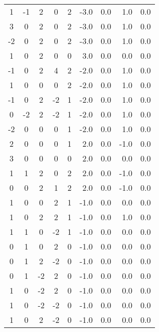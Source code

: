 \begin{center}
{\begin{xtabular}{|ccccc|rr|rr|}
  1 & -1 &  2 &  0 &  2 &      -3.0  &      0.0  &      1.0   &     0.0     \\
  3 &  0 &  2 &  0 &  2 &      -3.0  &      0.0  &      1.0   &     0.0     \\
 -2 &  0 &  2 &  0 &  2 &      -3.0  &      0.0  &      1.0   &     0.0     \\
  1 &  0 &  2 &  0 &  0 &       3.0  &      0.0  &      0.0   &     0.0     \\
 -1 &  0 &  2 &  4 &  2 &      -2.0  &      0.0  &      1.0   &     0.0     \\
  1 &  0 &  0 &  0 &  2 &      -2.0  &      0.0  &      1.0   &     0.0     \\
 -1 &  0 &  2 & -2 &  1 &      -2.0  &      0.0  &      1.0   &     0.0     \\
  0 & -2 &  2 & -2 &  1 &      -2.0  &      0.0  &      1.0   &     0.0     \\
 -2 &  0 &  0 &  0 &  1 &      -2.0  &      0.0  &      1.0   &     0.0     \\
  2 &  0 &  0 &  0 &  1 &       2.0  &      0.0  &     -1.0   &     0.0     \\
  3 &  0 &  0 &  0 &  0 &       2.0  &      0.0  &      0.0   &     0.0     \\
  1 &  1 &  2 &  0 &  2 &       2.0  &      0.0  &     -1.0   &     0.0     \\
  0 &  0 &  2 &  1 &  2 &       2.0  &      0.0  &     -1.0   &     0.0     \\
  1 &  0 &  0 &  2 &  1 &      -1.0  &      0.0  &      0.0   &     0.0     \\
  1 &  0 &  2 &  2 &  1 &      -1.0  &      0.0  &      1.0   &     0.0     \\
  1 &  1 &  0 & -2 &  1 &      -1.0  &      0.0  &      0.0   &     0.0     \\
  0 &  1 &  0 &  2 &  0 &      -1.0  &      0.0  &      0.0   &     0.0     \\
  0 &  1 &  2 & -2 &  0 &      -1.0  &      0.0  &      0.0   &     0.0     \\
  0 &  1 & -2 &  2 &  0 &      -1.0  &      0.0  &      0.0   &     0.0     \\
  1 &  0 & -2 &  2 &  0 &      -1.0  &      0.0  &      0.0   &     0.0     \\
  1 &  0 & -2 & -2 &  0 &      -1.0  &      0.0  &      0.0   &     0.0     \\
  1 &  0 &  2 & -2 &  0 &      -1.0  &      0.0  &      0.0   &     0.0     \\

\end{xtabular}}
\end{center}
